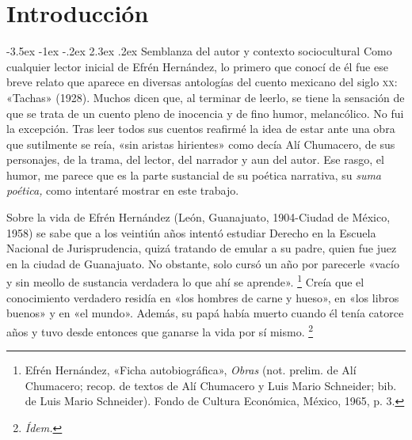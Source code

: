 \documentclass[14pt,twoside,final]{extbook} %
\makeatletter
\let\oldfootnote\footnote
\renewcommand\footnote[1]{%
\oldfootnote{\hspace{1mm}#1}}
\renewcommand\section{\@startsection {section}{1}{\z@}%
                                     {-3.5ex \@plus -1ex \@minus -.2ex}%
                                     {2.3ex \@plus .2ex}%
                                     {\normalfont\large\bfseries\sc}}
\makeatother
\begin{document}
\chapter[\textsc{Introducción}]{Introducción}\label{ch:introduccion}
\BgThispage
\pagestyle{empty}
\thispagestyle{empty}
\pagestyle{fancy}
\fancyhf{} %
\fancyhead[RO,LE]{\thepage}
\renewcommand{\headrulewidth}{0pt}
\section{Semblanza del autor y contexto sociocultural}\label{sec:semblanza-del-autor-y-contexto-sociocultural}
Como cualquier lector inicial de Efrén Hernández, lo primero que conocí de él fue ese breve relato que aparece en diversas antologías del cuento mexicano del siglo \textsc{xx}: «Tachas» (1928). Muchos dicen que, al terminar de leerlo, se tiene la sensación de que se trata de un cuento pleno de inocencia y de fino humor, melancólico. No fui la excepción. Tras leer todos sus cuentos reafirmé la idea de estar ante una obra que sutilmente se reía, «sin aristas hirientes» como decía Alí Chumacero, de sus personajes, de la trama, del lector, del narrador y aun del autor. Ese rasgo, el humor, me parece que es la parte sustancial de su poética narrativa, su \emph{suma poética,} como intentaré mostrar en este trabajo.

Sobre la vida de Efrén Hernández (León, Guanajuato, 1904-Ciudad de México, 1958) se sabe que a los veintiún años intentó estudiar Derecho en la Escuela Nacional de Jurisprudencia, quizá tratando de emular a su padre, quien fue juez en la ciudad de Guanajuato. No obstante, solo cursó un año por parecerle «vacío y sin meollo de sustancia verdadera lo que ahí se aprende».\footnote{Efrén Hernández, «Ficha autobiográfica», \emph{Obras} (not. prelim. de Alí Chumacero; recop. de textos de Alí Chumacero y Luis Mario Schneider; bib. de Luis Mario Schneider). Fondo de Cultura Económica, México, 1965, p. 3.} Creía que el conocimiento verdadero residía en «los hombres de carne y hueso», en «los libros buenos» y en «el mundo». Además, su papá había muerto cuando él tenía catorce años y tuvo desde entonces que ganarse la vida por sí mismo.\footnote{\em Ídem.}
\end{document}
